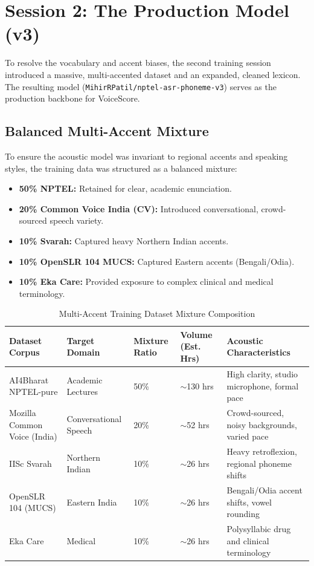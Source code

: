 \section{Session 2: The Production Model (v3)}
To resolve the vocabulary and accent biases, the second training session introduced a massive, multi-accented dataset and an expanded, cleaned lexicon. The resulting model (\texttt{MihirRPatil/}\allowbreak\texttt{nptel-asr-phoneme-v3}) serves as the production backbone for VoiceScore.

\subsection{Balanced Multi-Accent Mixture}
To ensure the acoustic model was invariant to regional accents and speaking styles, the training data was structured as a balanced mixture:
\begin{itemize}
    \item \textbf{50\% NPTEL:} Retained for clear, academic enunciation.
    \item \textbf{20\% Common Voice India (CV):} Introduced conversational, crowd-sourced speech variety.
    \item \textbf{10\% Svarah:} Captured heavy Northern Indian accents.
    \item \textbf{10\% OpenSLR 104 MUCS:} Captured Eastern accents (Bengali/Odia).
    \item \textbf{10\% Eka Care:} Provided exposure to complex clinical and medical terminology.
\end{itemize}

\begin{table}[h]
    \centering
    \small
    \caption{Multi-Accent Training Dataset Mixture Composition}
    \label{tab:dataset_composition}
    \begin{tabular}{p{3.5cm} p{3.2cm} p{1.8cm} p{1.8cm} p{4.2cm}}
        \toprule
        \textbf{Dataset Corpus} & \textbf{Target Domain} & \textbf{Mixture Ratio} & \textbf{Volume (Est. Hrs)} & \textbf{Acoustic Characteristics} \\
        \midrule
        AI4Bharat NPTEL-pure & Academic Lectures & 50\% & $\sim$130 hrs & High clarity, studio microphone, formal pace \\
        Mozilla Common Voice (India) & Conversational Speech & 20\% & $\sim$52 hrs & Crowd-sourced, noisy backgrounds, varied pace \\
        IISc Svarah & Northern Indian & 10\% & $\sim$26 hrs & Heavy retroflexion, regional phoneme shifts \\
        OpenSLR 104 (MUCS) & Eastern India & 10\% & $\sim$26 hrs & Bengali/Odia accent shifts, vowel rounding \\
        Eka Care & Medical & 10\% & $\sim$26 hrs & Polysyllabic drug and clinical terminology \\
        \bottomrule
    \end{tabular}
\end{table}

